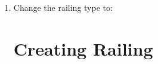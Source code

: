 \documentclass{tufte-book} %
\begin{document}
\begin{enumerate}
	\item Change the railing type to: 
	
\section{Creating Railing}

\end{enumerate}
	
		


	


\backmatter




\printindex %
\end{document}
